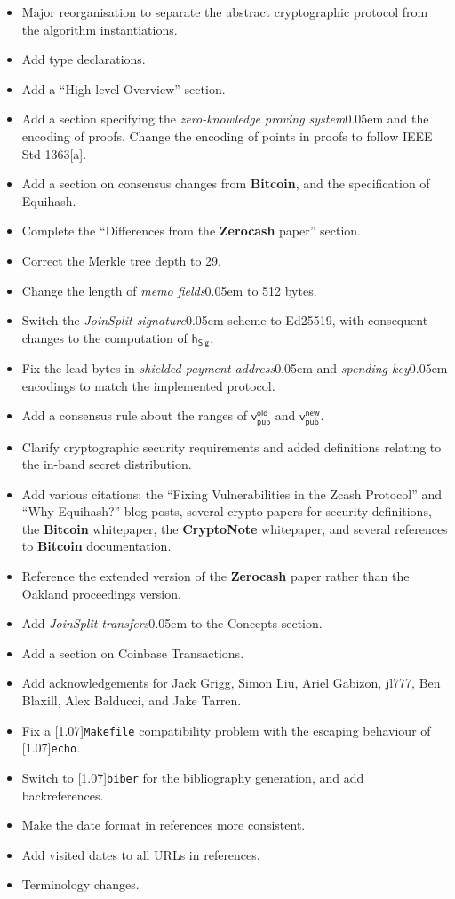 \documentclass{article}
\let\oldtexttt\texttt
\renewcommand{\texttt}[1]{\scalebox{1.02}[1.07]{\oldtexttt{#1}}}
\numberwithin{theorem}{subsection}
\newcommand{\term}[1]{\textsl{#1}\kern 0.05em\xspace}
\newcommand{\termbf}[1]{\textbf{#1}\xspace}
\newcommand{\Zerocash}{\termbf{Zerocash}}
\newcommand{\Bitcoin}{\termbf{Bitcoin}}
\newcommand{\CryptoNote}{\termbf{CryptoNote}}
\newcommand{\joinSplitTransfers}{\term{JoinSplit transfers}}
\newcommand{\joinSplitSignature}{\term{JoinSplit signature}}
\newcommand{\zeroKnowledgeProvingSystem}{\term{zero-knowledge proving system}}
\newcommand{\paymentAddress}{\term{shielded payment address}}
\newcommand{\spendingKey}{\term{spending key}}
\newcommand{\memos}{\term{memo fields}}
\newcommand{\hSig}{\mathsf{h_{Sig}}}
\newcommand{\vpubOld}{\mathsf{v_{pub}^{old}}}
\newcommand{\vpubNew}{\mathsf{v_{pub}^{new}}}
\begin{document}
\begin{itemize}
    \item Major reorganisation to separate the abstract cryptographic protocol
          from the algorithm instantiations.
    \item Add type declarations.
    \item Add a ``High-level Overview'' section.
    \item Add a section specifying the \zeroKnowledgeProvingSystem and the
          encoding of proofs. Change the encoding of points in proofs to follow
          IEEE Std 1363[a].
    \item Add a section on consensus changes from \Bitcoin, and the specification
          of Equihash.
    \item Complete the ``Differences from the \Zerocash paper'' section.
    \item Correct the Merkle tree depth to 29.
    \item Change the length of \memos to 512 bytes.
    \item Switch the \joinSplitSignature scheme to Ed25519, with consequent
          changes to the computation of $\hSig$.
    \item Fix the lead bytes in \paymentAddress and \spendingKey encodings to
          match the implemented protocol.
    \item Add a consensus rule about the ranges of $\vpubOld$ and $\vpubNew$.
    \item Clarify cryptographic security requirements and added definitions
          relating to the in-band secret distribution.
    \item Add various citations: the ``Fixing Vulnerabilities in the Zcash
          Protocol'' and ``Why Equihash?'' blog posts, several crypto papers
          for security definitions, the \Bitcoin whitepaper, the \CryptoNote
          whitepaper, and several references to \Bitcoin documentation.
    \item Reference the extended version of the \Zerocash paper rather than the
          Oakland proceedings version.
    \item Add \joinSplitTransfers to the Concepts section.
    \item Add a section on Coinbase Transactions.
    \item Add acknowledgements for Jack Grigg, Simon Liu, Ariel Gabizon, jl777,
          Ben Blaxill, Alex Balducci, and Jake Tarren.
    \item Fix a \texttt{Makefile} compatibility problem with the escaping behaviour
          of \texttt{echo}.
    \item Switch to \texttt{biber} for the bibliography generation, and add
          backreferences.
    \item Make the date format in references more consistent.
    \item Add visited dates to all URLs in references.
    \item Terminology changes.
\end{itemize}
\end{document}
